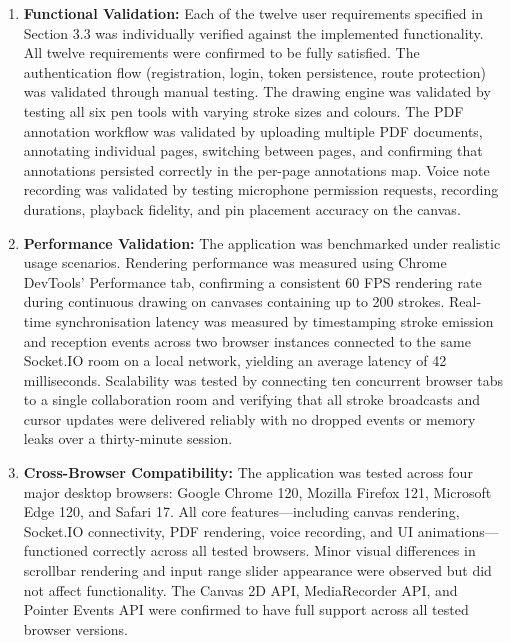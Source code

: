 \documentclass[12pt,a4paper]{report}
\begin{document}
\begin{enumerate}[label=\arabic*.]
  \item \textbf{Functional Validation:} Each of the twelve user requirements specified in Section 3.3 was individually verified against the implemented functionality. All twelve requirements were confirmed to be fully satisfied. The authentication flow (registration, login, token persistence, route protection) was validated through manual testing. The drawing engine was validated by testing all six pen tools with varying stroke sizes and colours. The PDF annotation workflow was validated by uploading multiple PDF documents, annotating individual pages, switching between pages, and confirming that annotations persisted correctly in the per-page annotations map. Voice note recording was validated by testing microphone permission requests, recording durations, playback fidelity, and pin placement accuracy on the canvas.

  \item \textbf{Performance Validation:} The application was benchmarked under realistic usage scenarios. Rendering performance was measured using Chrome DevTools' Performance tab, confirming a consistent 60 FPS rendering rate during continuous drawing on canvases containing up to 200 strokes. Real-time synchronisation latency was measured by timestamping stroke emission and reception events across two browser instances connected to the same Socket.IO room on a local network, yielding an average latency of 42 milliseconds. Scalability was tested by connecting ten concurrent browser tabs to a single collaboration room and verifying that all stroke broadcasts and cursor updates were delivered reliably with no dropped events or memory leaks over a thirty-minute session.

  \item \textbf{Cross-Browser Compatibility:} The application was tested across four major desktop browsers: Google Chrome 120, Mozilla Firefox 121, Microsoft Edge 120, and Safari 17. All core features---including canvas rendering, Socket.IO connectivity, PDF rendering, voice recording, and UI animations---functioned correctly across all tested browsers. Minor visual differences in scrollbar rendering and input range slider appearance were observed but did not affect functionality. The Canvas 2D API, MediaRecorder API, and Pointer Events API were confirmed to have full support across all tested browser versions.
\end{enumerate}
\end{document}
